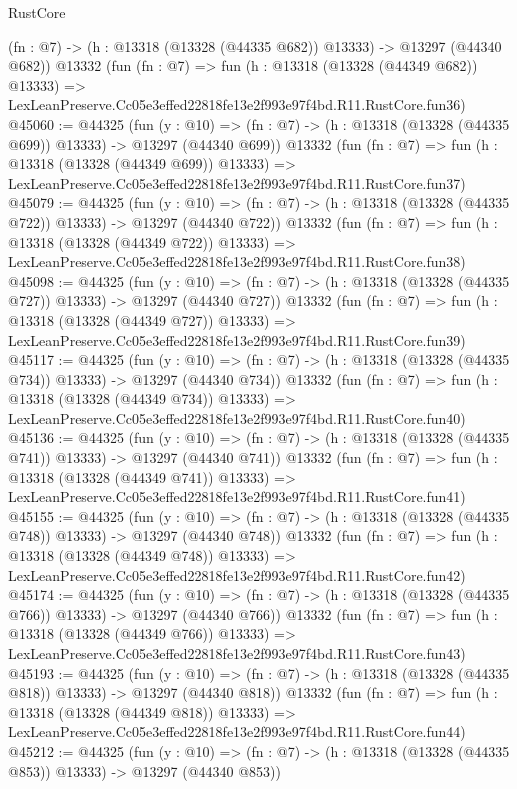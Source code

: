 \begin{lexlean}{RustCore}
\begin{coremodule}
    (fn : @7) -> (h : @13318 (@13328 (@44335 @682)) @13333) -> @13297 (@44340 @682))
    @13332
    (fun (fn : @7) =>
    fun (h : @13318 (@13328 (@44349 @682)) @13333) =>
    LexLeanPreserve.Cc05e3effed22818fe13e2f993e97f4bd.R11.RustCore.fun36)
@45060 := @44325
    (fun (y : @10) =>
    (fn : @7) -> (h : @13318 (@13328 (@44335 @699)) @13333) -> @13297 (@44340 @699))
    @13332
    (fun (fn : @7) =>
    fun (h : @13318 (@13328 (@44349 @699)) @13333) =>
    LexLeanPreserve.Cc05e3effed22818fe13e2f993e97f4bd.R11.RustCore.fun37)
@45079 := @44325
    (fun (y : @10) =>
    (fn : @7) -> (h : @13318 (@13328 (@44335 @722)) @13333) -> @13297 (@44340 @722))
    @13332
    (fun (fn : @7) =>
    fun (h : @13318 (@13328 (@44349 @722)) @13333) =>
    LexLeanPreserve.Cc05e3effed22818fe13e2f993e97f4bd.R11.RustCore.fun38)
@45098 := @44325
    (fun (y : @10) =>
    (fn : @7) -> (h : @13318 (@13328 (@44335 @727)) @13333) -> @13297 (@44340 @727))
    @13332
    (fun (fn : @7) =>
    fun (h : @13318 (@13328 (@44349 @727)) @13333) =>
    LexLeanPreserve.Cc05e3effed22818fe13e2f993e97f4bd.R11.RustCore.fun39)
@45117 := @44325
    (fun (y : @10) =>
    (fn : @7) -> (h : @13318 (@13328 (@44335 @734)) @13333) -> @13297 (@44340 @734))
    @13332
    (fun (fn : @7) =>
    fun (h : @13318 (@13328 (@44349 @734)) @13333) =>
    LexLeanPreserve.Cc05e3effed22818fe13e2f993e97f4bd.R11.RustCore.fun40)
@45136 := @44325
    (fun (y : @10) =>
    (fn : @7) -> (h : @13318 (@13328 (@44335 @741)) @13333) -> @13297 (@44340 @741))
    @13332
    (fun (fn : @7) =>
    fun (h : @13318 (@13328 (@44349 @741)) @13333) =>
    LexLeanPreserve.Cc05e3effed22818fe13e2f993e97f4bd.R11.RustCore.fun41)
@45155 := @44325
    (fun (y : @10) =>
    (fn : @7) -> (h : @13318 (@13328 (@44335 @748)) @13333) -> @13297 (@44340 @748))
    @13332
    (fun (fn : @7) =>
    fun (h : @13318 (@13328 (@44349 @748)) @13333) =>
    LexLeanPreserve.Cc05e3effed22818fe13e2f993e97f4bd.R11.RustCore.fun42)
@45174 := @44325
    (fun (y : @10) =>
    (fn : @7) -> (h : @13318 (@13328 (@44335 @766)) @13333) -> @13297 (@44340 @766))
    @13332
    (fun (fn : @7) =>
    fun (h : @13318 (@13328 (@44349 @766)) @13333) =>
    LexLeanPreserve.Cc05e3effed22818fe13e2f993e97f4bd.R11.RustCore.fun43)
@45193 := @44325
    (fun (y : @10) =>
    (fn : @7) -> (h : @13318 (@13328 (@44335 @818)) @13333) -> @13297 (@44340 @818))
    @13332
    (fun (fn : @7) =>
    fun (h : @13318 (@13328 (@44349 @818)) @13333) =>
    LexLeanPreserve.Cc05e3effed22818fe13e2f993e97f4bd.R11.RustCore.fun44)
@45212 := @44325
    (fun (y : @10) =>
    (fn : @7) -> (h : @13318 (@13328 (@44335 @853)) @13333) -> @13297 (@44340 @853))

\end{coremodule}
\end{lexlean}
